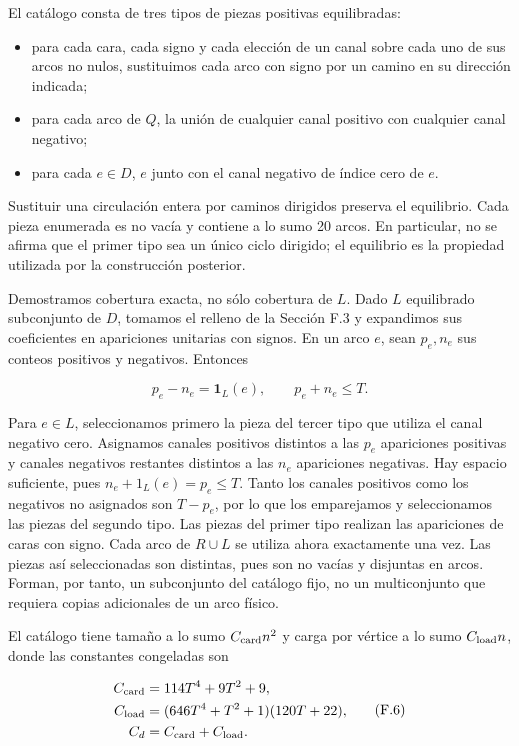 \documentclass[spanish,11pt,a4paper]{article}
\providecommand{\tightlist}{\setlength{\itemsep}{0pt}\setlength{\parskip}{0pt}}
\begin{document}
El catálogo consta de tres tipos de piezas positivas equilibradas:

\begin{itemize}
\tightlist
\item
  para cada cara, cada signo y cada elección de un canal sobre cada uno de sus arcos no nulos, sustituimos cada arco con signo por un camino en su dirección indicada;
\item
  para cada arco de \(Q\), la unión de cualquier canal positivo con cualquier canal negativo;
\item
  para cada \(e\in D\), \(e\) junto con el canal negativo de índice cero de \(e\).
\end{itemize}

Sustituir una circulación entera por caminos dirigidos preserva el equilibrio. Cada pieza enumerada es no vacía y contiene a lo sumo 20 arcos. En particular, no se afirma que el primer tipo sea un único ciclo dirigido; el equilibrio es la propiedad utilizada por la construcción posterior.

Demostramos cobertura exacta, no sólo cobertura de \(L\). Dado \(L\) equilibrado subconjunto de \(D\), tomamos el relleno de la Sección F.3 y expandimos sus coeficientes en apariciones unitarias con signos. En un arco \(e\), sean \(p_{e},n_{e}\) sus conteos positivos y negativos. Entonces

\[p_e-n_e=\mathbf1_L(e),\qquad p_e+n_e\le T.\]

Para \(e\in L\), seleccionamos primero la pieza del tercer tipo que utiliza el canal negativo cero. Asignamos canales positivos distintos a las \(p_{e}\) apariciones positivas y canales negativos restantes distintos a las \(n_{e}\) apariciones negativas. Hay espacio suficiente, pues \(n_{e}+1_{L}(e)=p_{e}\le T\). Tanto los canales positivos como los negativos no asignados son \(T-p_{e}\), por lo que los emparejamos y seleccionamos las piezas del segundo tipo. Las piezas del primer tipo realizan las apariciones de caras con signo. Cada arco de \(R\cup L\) se utiliza ahora exactamente una vez. Las piezas así seleccionadas son distintas, pues son no vacías y disjuntas en arcos. Forman, por tanto, un subconjunto del catálogo fijo, no un multiconjunto que requiera copias adicionales de un arco físico.

El catálogo tiene tamaño a lo sumo \(C_{\rm card}n^2\) y carga por vértice a lo sumo \(C_{\rm load}n\), donde las constantes congeladas son

\[\begin{aligned}C_{\rm card}&=114T^4+9T^2+9,\\C_{\rm load}&=(646T^4+T^2+1)(120T+22),\\C_d&=C_{\rm card}+C_{\rm load}.\end{aligned}\tag{F.6}\]
\end{document}

